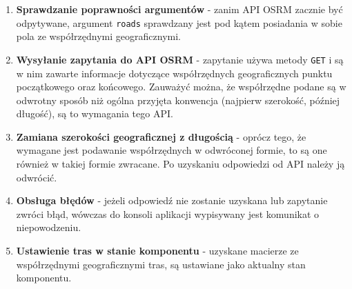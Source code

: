   \begin{enumerate}
    \item \textbf{Sprawdzanie poprawności argumentów} - zanim API OSRM zacznie być odpytywane, argument \texttt{roads} sprawdzany jest pod kątem posiadania w sobie pola ze współrzędnymi geograficznymi.
    \item \textbf{Wysyłanie zapytania do API OSRM} - zapytanie używa metody \texttt{GET} i są w nim zawarte informacje dotyczące współrzędnych geograficznych punktu początkowego oraz końcowego. Zauważyć można, że współrzędne podane są w odwrotny sposób niż ogólna przyjęta konwencja (najpierw szerokość, później długość), są to wymagania tego API.
    \item \textbf{Zamiana szerokości geograficznej z długością} - oprócz tego, że wymagane jest podawanie współrzędnych w odwróconej formie, to są one również w takiej formie zwracane. Po uzyskaniu odpowiedzi od API należy ją odwrócić.
    \item \textbf{Obsługa błędów} - jeżeli odpowiedź nie zostanie uzyskana lub zapytanie zwróci błąd, wówczas do konsoli aplikacji wypisywany jest komunikat o niepowodzeniu.
    \item \textbf{Ustawienie tras w stanie komponentu} - uzyskane macierze ze współrzędnymi geograficznymi tras, są ustawiane jako aktualny stan komponentu.
  \end{enumerate}
  
